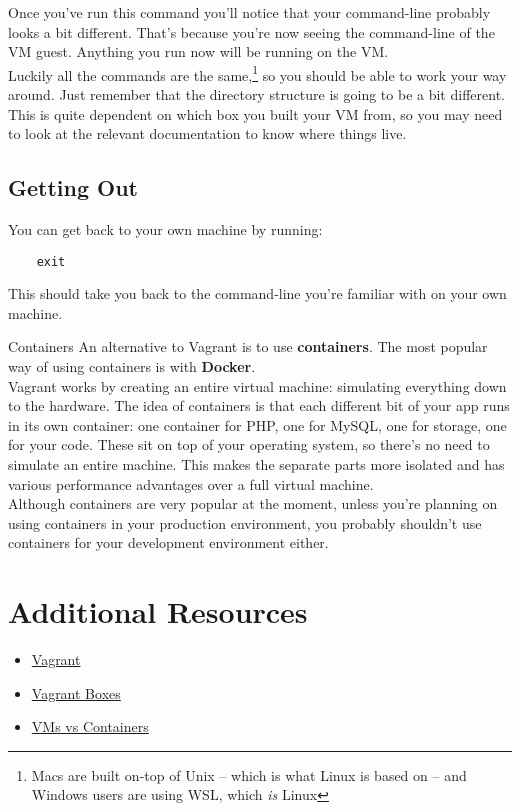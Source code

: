 Once you've run this command you'll notice that your command-line probably looks a bit different. That's because you're now seeing the command-line of the VM guest. Anything you run now will be running on the VM.
\\

Luckily all the commands are the same,\footnote{Macs are built on-top of Unix – which is what Linux is based on – and Windows users are using WSL, which \textit{is} Linux} so you should be able to work your way around. Just remember that the directory structure is going to be a bit different. This is quite dependent on which box you built your VM from, so you may need to look at the relevant documentation to know where things live.

\subsection{Getting Out}

You can get back to your own machine by running:

\begin{verbatim}
    exit
\end{verbatim}

This should take you back to the command-line you're familiar with on your own machine.

\pagebreak

\begin{infobox}{Containers}
    An alternative to Vagrant is to use \textbf{containers}. The most popular way of using containers is with \textbf{Docker}.
    \\

    Vagrant works by creating an entire virtual machine: simulating everything down to the hardware. The idea of containers is that each different bit of your app runs in its own container: one container for PHP, one for MySQL, one for storage, one for your code. These sit on top of your operating system, so there's no need to simulate an entire machine. This makes the separate parts more isolated and has various performance advantages over a full virtual machine.
    \\

    Although containers are very popular at the moment, unless you're planning on using containers in your production environment, you probably shouldn't use containers for your development environment either.
\end{infobox}

\section{Additional Resources}

\begin{itemize}[leftmargin=*]
    \item \href{https://www.vagrantup.com}{Vagrant}
    \item \href{https://app.vagrantup.com/boxes/search}{Vagrant Boxes}
    \item \href{https://www.backblaze.com/blog/vm-vs-containers/}{VMs vs Containers}
\end{itemize}